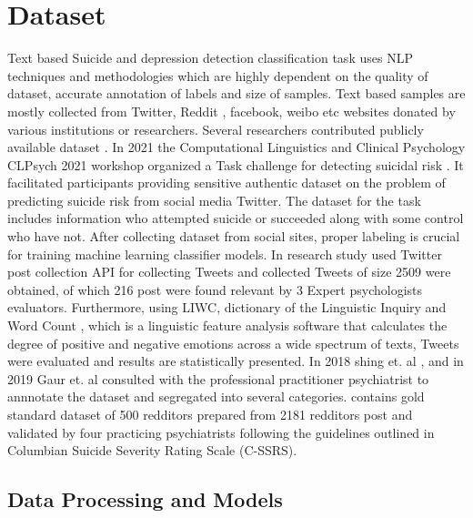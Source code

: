 \documentclass[sn-mathphys,Numbered]{sn-jnl}%
\theoremstyle{thmstyleone}%
\theoremstyle{thmstyletwo}%
\theoremstyle{thmstylethree}%
\begin{document}
\section{Dataset}
Text based Suicide and depression detection classification task uses NLP techniques and methodologies which are highly dependent on the quality of dataset, accurate annotation of labels and size of samples. Text based samples are mostly collected from Twitter, Reddit \cite{tadesse2019detection}, facebook, weibo etc websites donated by various institutions or researchers. Several researchers contributed publicly available dataset \cite{rissola2020dataset}. In 2021 the Computational Linguistics and Clinical Psychology CLPsych 2021 workshop organized a Task challenge for detecting suicidal risk \cite{macavaney2021community}. It facilitated participants providing sensitive authentic dataset on the problem of predicting suicide risk from social media Twitter. The dataset for the task includes information who attempted suicide or succeeded along with some control who have not. After collecting dataset from social sites, proper labeling is crucial for training machine learning classifier models. In\cite{lopez2022exploring} research study used Twitter post collection API for collecting Tweets and collected Tweets of size 2509 were obtained, of which 216 post were found relevant by 3 Expert psychologists evaluators. Furthermore, using LIWC, dictionary of the Linguistic Inquiry and Word Count \cite{pennebaker2001linguistic}, which is a linguistic feature analysis software that calculates the degree of positive and negative emotions across a wide spectrum of texts, Tweets were evaluated and results are statistically presented. In 2018 shing et. al \cite{shing2018expert}, and in 2019 Gaur et. al \cite{gaur2019knowledge} consulted with the professional practitioner psychiatrist to annnotate the dataset and segregated into several categories. \cite{gaur2019knowledge} contains gold standard dataset of 500 redditors prepared from 2181 redditors post and validated by four practicing psychiatrists following the guidelines outlined in Columbian Suicide Severity Rating Scale (C-SSRS). 

\subsection{Data Processing and Models}
\end{document}
